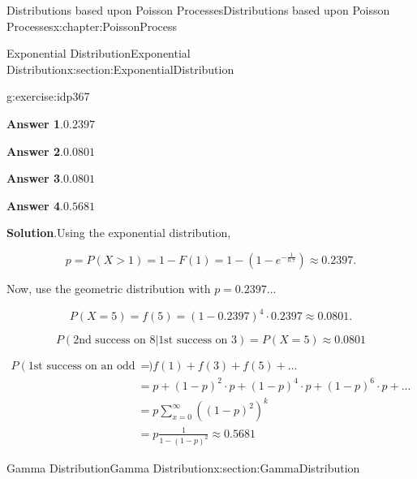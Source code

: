 \documentclass[oneside,10pt,]{book}
\newcommand{\blocktitlefont}{\relax}
\numberwithin{equation}{section}
\newcommand{\gt}{>}
\newcommand{\amp}{&}
\begin{document}
\begin{chapterptx}{Distributions based upon Poisson Processes}{}{Distributions based upon Poisson Processes}{}{}{x:chapter:PoissonProcess}
\begin{sectionptx}{Exponential Distribution}{}{Exponential Distribution}{}{}{x:section:ExponentialDistribution}
\begin{inlineexercise}{}{g:exercise:idp367}
\par\smallskip%
\noindent\textbf{\blocktitlefont Answer 1}.\hypertarget{g:answer:idp369}{}\quad{}\(0.2397\)%
\par\smallskip%
\noindent\textbf{\blocktitlefont Answer 2}.\hypertarget{g:answer:idp370}{}\quad{}\(0.0801\)%
\par\smallskip%
\noindent\textbf{\blocktitlefont Answer 3}.\hypertarget{g:answer:idp371}{}\quad{}\(0.0801\)%
\par\smallskip%
\noindent\textbf{\blocktitlefont Answer 4}.\hypertarget{g:answer:idp372}{}\quad{}\(0.5681\)%
\par\smallskip%
\noindent\textbf{\blocktitlefont Solution}.\hypertarget{g:solution:idp373}{}\quad{}Using the exponential distribution,%
\par
%
\begin{equation*}
p = P(X \gt 1) = 1 - F(1) = 1 - (1-e^{-\frac{1}{0.7}}) \approx 0.2397.
\end{equation*}
%
\par
Now, use the geometric distribution with \(p = 0.2397\text{...}\)%
\par
%
\begin{equation*}
P(X = 5) = f(5) = (1-0.2397)^4 \cdot 0.2397 \approx 0.0801.
\end{equation*}
%
\par
%
\begin{equation*}
P(\text{2nd success on 8} | \text{1st success on 3}) = P(X = 5) \approx 0.0801
\end{equation*}
%
\par
%
\begin{equation*}
\begin{aligned}
P(\text{1st success on an odd trial}) \amp  = f(1) + f(3) + f(5) + ...\\
\amp  = p + (1-p)^2 \cdot p + (1-p)^4 \cdot p + (1-p)^6 \cdot p + ... \\
\amp  = p \sum_{x=0}^{\infty} \left ( (1-p)^2 \right)^k \\
\amp  = p \frac{1}{1-(1-p)^2} \approx 0.5681
\end{aligned}
\end{equation*}
%
\end{inlineexercise}%
\end{sectionptx}
%
%
\typeout{************************************************}
\typeout{************************************************}
%
\begin{sectionptx}{Gamma Distribution}{}{Gamma Distribution}{}{}{x:section:GammaDistribution}

\end{sectionptx}
\end{chapterptx}
\end{document}
